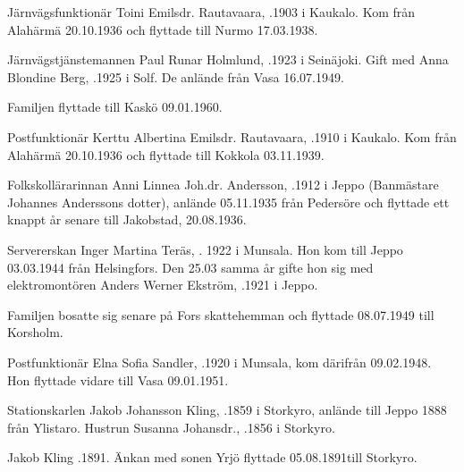 {Järnvägsfunktionär Toini Emilsdr. Rautavaara, .1903 i Kaukalo. Kom från Alahärmä 20.10.1936 och flyttade till Nurmo 17.03.1938.


Järnvägstjänstemannen Paul Runar Holmlund, .1923 i Seinäjoki. Gift med Anna Blondine Berg, .1925 i Solf. De anlände från Vasa 16.07.1949.
\begin{jhchildren}
  \item {}
  \item {}
\end{jhchildren}
Familjen flyttade till Kaskö 09.01.1960.


Postfunktionär Kerttu Albertina Emilsdr. Rautavaara, .1910 i Kaukalo. Kom från Alahärmä 20.10.1936 och flyttade till Kokkola 03.11.1939.


Folkskollärarinnan Anni Linnea Joh.dr. Andersson, .1912 i Jeppo (Banmästare Johannes Anderssons dotter), anlände 05.11.1935 från Pedersöre och flyttade ett knappt år senare till Jakobstad, 20.08.1936.


Servererskan Inger Martina Teräs, . 1922 i Munsala. Hon kom till Jeppo 03.03.1944 från Helsingfors. Den 25.03 samma år gifte hon sig med elektromontören Anders Werner Ekström, .1921 i Jeppo.
\begin{jhchildren}
  \item {}
  \item {}
\end{jhchildren}
Familjen bosatte sig senare på Fors skattehemman och flyttade 08.07.1949 till Korsholm.


Postfunktionär Elna Sofia Sandler, .1920 i Munsala, kom därifrån 09.02.1948. Hon flyttade vidare till Vasa 09.01.1951.

Stationskarlen Jakob Johansson Kling, .1859 i Storkyro, anlände till Jeppo 1888 från Ylistaro. Hustrun Susanna Johansdr., .1856 i Storkyro.
\begin{jhchildren}
  \item {}
  \item {}
\end{jhchildren}
Jakob Kling .1891. Änkan med sonen Yrjö flyttade 05.08.1891till Storkyro.


}

